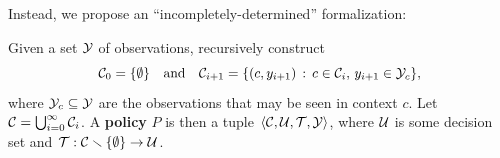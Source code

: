 \begin{example}
\begin{figure}[h]
\begin{floatrow}
\quad
{}\quad\quad
{}
\end{floatrow}
\end{figure}
\end{example}
Instead, we propose an ``incompletely-determined'' formalization:
\fi
\begin{definition}[Policies]
Given a set $\mathcal{Y}$ of observations, recursively construct
\begin{equation}
\mathcal{C}_0 = \{\emptyset\}\quad\text{and}\quad\mathcal{C}_{i+1} = \{(c,y_{i+1})\,:\,c\in\mathcal{C}_i,\, y_{i+1}\in\mathcal{Y}_c\},
\end{equation}
where $\mathcal{Y}_c\subseteq\mathcal{Y}$ are the observations that may be seen in context $c$.  
Let $\mathcal{C} = \bigcup_{i=0}^{\infty}\mathcal{C}_i$.
A \textbf{policy} $P$ is then a tuple $\left\langle\mathcal{C}, \mathcal{U}, \mathcal{T}, \mathcal{Y}\right\rangle$, 
where $\mathcal{U}$ is some decision set and $\mathcal{T}:\mathcal{C}\smallsetminus\{\emptyset\}\to\mathcal{U}$.
\end{definition}
